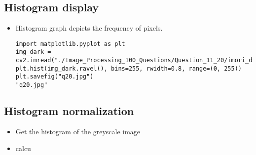 \documentclass[letterpaper, 11pt]{article}
\begin{document}
\subsection{Histogram display}
\label{sec:org613a87f}
\begin{itemize}
\item Histogram graph depicts the frequency of pixels.
\begin{verbatim}
import matplotlib.pyplot as plt
img_dark = cv2.imread("./Image_Processing_100_Questions/Question_11_20/imori_dark.jpg").astype(np.float32)
plt.hist(img_dark.ravel(), bins=255, rwidth=0.8, range=(0, 255))
plt.savefig("q20.jpg")
"q20.jpg"
\end{verbatim}
\end{itemize}
\subsection{Histogram normalization}
\label{sec:orgcff03b1}
\begin{itemize}
\item Get the histogram of the greyscale image
\item calcu
\end{itemize}
\end{document}
